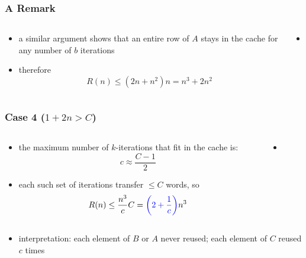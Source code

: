 \documentclass[12pt,dvipdfmx]{beamer}
\newcommand{\ao}[1]{{\color{blue}#1}}
\begin{document}
\begin{frame}
\frametitle{A Remark}
\begin{columns}
  \begin{column}{0.5\textwidth}
\begin{itemize}
\item a similar argument shows that an entire row of $A$ stays in the cache
  for any number of $b$ iterations
\item therefore
  \[ R(n) \leq (2n + n^2) n = n^3 + 2n^2 \]
\end{itemize}
  \end{column}

  \begin{column}{0.5\textwidth}
    \begin{itemize}
    \item []
{\tiny\def\svgwidth{0.9\textwidth}}
\end{itemize}
\end{column}
\end{columns}
\end{frame}

\begin{frame}
\frametitle{Case 4 ($1 + 2n > C$)}
\begin{columns}
  \begin{column}{0.5\textwidth}
\begin{itemize}
\item the maximum number of $k$-iterations
  that fit in the cache is:
\[ c \approx \frac{C - 1}{2} \]
\item each such set of iterations transfer $\leq C$ words, so
\[ R(n) \leq \frac{n^3}{c} C 
= \ao{\left(2 + \frac{1}{c}\right)} n^3
\]
\end{itemize}
  \end{column}

  \begin{column}{0.5\textwidth}
    \begin{itemize}
    \item []
{\tiny\def\svgwidth{0.9\textwidth}}
\end{itemize}
\end{column}
\end{columns}

\begin{itemize}
\item []
\ao{interpretation:} each element of $B$ or $A$ never reused; each element of $C$
reused $c$ times
\end{itemize}
\end{frame}
\end{document}
